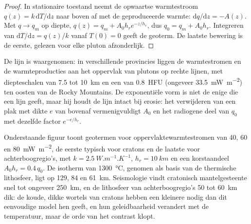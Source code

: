 \begin{proof}
In stationaire toestand neemt de opwaartse warmtestroom $q(z) = k\,\mathrm dT/\mathrm dz$ naar boven af
met de geproduceerde warmte: $\mathrm dq/\mathrm dz = -A(z)$. Met $q \to q_m$
op diepte, $q(z) = q_m + A_0h_re^{-z/h_r}$, dus $q_0 = q_m + A_0h_r$. Integreren van
$\mathrm dT/\mathrm dz = q(z)/k$ vanaf $T(0) = 0$ geeft de geoterm. De laatste
bewering is de eerste, gelezen voor elke pluton afzonderlijk.
\end{proof}

De lijn is waargenomen: in verschillende provincies liggen de warmtestromen en de warmteproducties
aan het oppervlak van plutons op rechte lijnen, met diepteschalen van 7.5 tot
\qty{10}{km} en een  van \qty{0.8}{HFU} (ongeveer
\qty{33.5}{mW.m^{-2}}) ten oosten van de Rocky Mountains. De exponentiële vorm is niet
de enige die een lijn geeft, maar hij houdt de lijn intact bij erosie: het verwijderen van een plak met dikte $e$ van bovenaf vermenigvuldigt
$A_0$ en het radiogene deel van $q_0$ met dezelfde factor $e^{-e/h_r}$.

Onderstaande figuur toont geotermen voor oppervlaktewarmtestromen van 40, 60 en
\qty{80}{mW.m^{-2}}, de eerste typisch voor cratons en de laatste voor achterboogregio's, met
$k = \qty{2.5}{W.m^{-1}.K^{-1}}$, $h_r = \qty{10}{km}$ en een korstaandeel
$A_0h_r = 0.4\,q_0$. De isotherm van \qty{1300}{\celsius}, genomen als basis van de
thermische lithosfeer, ligt op 129, 84 en \qty{61}{km}.
Seismologie vindt cratonisch mantelgesteente snel tot ongeveer \qty{250}{km}, en de
lithosfeer van achterboogregio's 50 tot \qty{60}{km} dik: de koude, dikke wortels van cratons
hebben een kleinere  nodig dan dit eenvoudige model hen geeft, en hun
geleidbaarheid verandert met de temperatuur, maar de orde van het contrast klopt.

